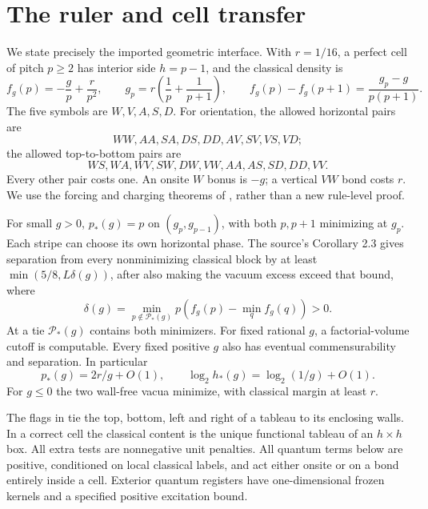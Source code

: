 \section{The ruler and cell transfer}\label{sec:ruler}
We state precisely the imported geometric interface. With
$r=1/16$, a perfect cell of pitch $p\geq2$ has interior side $h=p-1$,
and the classical density is
\begin{equation}\label{eq:ruler}
 f_g(p)=-\frac gp+\frac r{p^2},\qquad
 g_p=r\left(\frac1p+\frac1{p+1}\right),\qquad
 f_g(p)-f_g(p+1)=\frac{g_p-g}{p(p+1)}.
\end{equation}
The five symbols are $W,V,A,S,D$. For orientation, the allowed horizontal
pairs are
\[
 WW,AA,SA,DS,DD,AV,SV,VS,VD;
\]
the allowed top-to-bottom pairs are
\[
 WS,WA,WV,SW,DW,VW,AA,AS,SD,DD,VV.
\]
Every other pair costs one. An onsite $W$ bonus is $-g$; a vertical
$VW$ bond costs $r$. We use the forcing and charging theorems of
\cite[Lemmas 2.1--2.2]{gap}, rather than a new rule-level proof.

For small $g>0$, $p_*(g)=p$ on $(g_p,g_{p-1})$, with both $p,p+1$
minimizing at $g_p$. Each stripe can choose its own horizontal phase.
The source's Corollary 2.3 gives separation from every nonminimizing
classical block by at least $\min(5/8,L\delta(g))$, after also making
the vacuum excess exceed that bound, where
\[
 \delta(g)=\min_{p\notin\mathcal P_*(g)}
       p(f_g(p)-\min_q f_g(q))>0.
\]
At a tie $\mathcal P_*(g)$ contains both minimizers. For fixed rational
$g$, a factorial-volume cutoff is computable. Every fixed positive
$g$ also has eventual commensurability and separation. In particular
\begin{equation}\label{eq:pitch}
 p_*(g)=2r/g+O(1),\qquad \log_2h_*(g)=\log_2(1/g)+O(1).
\end{equation}
For $g\leq0$ the two wall-free vacua minimize, with classical margin
at least $r$.

The flags in \cite[Sections 5 and 11]{gap} tie the top, bottom, left
and right of a tableau to its enclosing walls. In a correct cell the
classical content is the unique functional tableau of an $h\times h$
box. All extra tests are nonnegative unit penalties. All quantum terms
below are positive, conditioned on local classical labels, and act
either onsite or on a bond entirely inside a cell. Exterior quantum
registers have one-dimensional frozen kernels and a specified positive
excitation bound.

